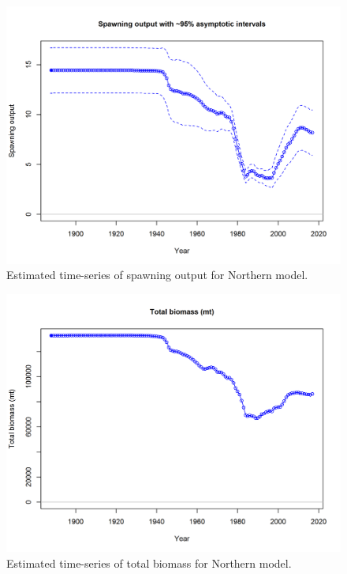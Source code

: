 \documentclass[12pt,]{article}
\begin{document}
\begin{figure}[htbp]
\centering
\includegraphics{r4ss/plots_mod1/ts7_Spawning_output_with_95_asymptotic_intervals_intervals.png}
\caption{Estimated time-series of spawning output for Northern model.
\label{fig:ssb}}
\end{figure}

\FloatBarrier

\begin{figure}[htbp]
\centering
\includegraphics{r4ss/plots_mod1/ts1_Total_biomass_(mt).png}
\caption{Estimated time-series of total biomass for Northern model.
\label{fig:total_bio}}
\end{figure}
\end{document}
